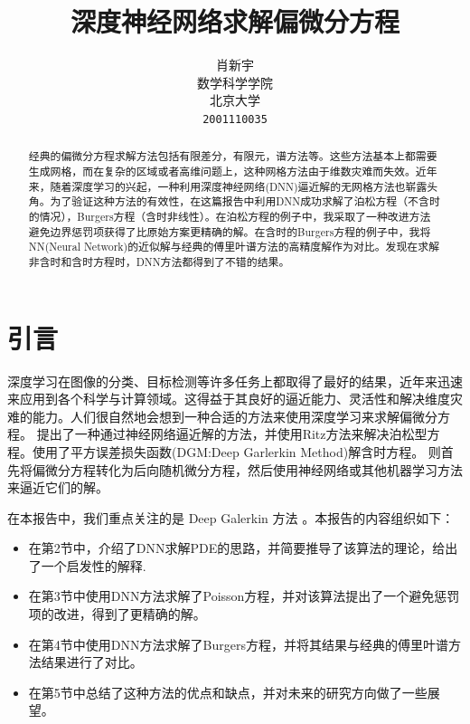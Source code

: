 \documentclass{article}
\title{深度神经网络求解偏微分方程}
\author{
  肖新宇\\数学科学学院\\北京大学\\ \texttt{2001110035} \\
}
\begin{document}
\maketitle

\begin{abstract}
\par 经典的偏微分方程求解方法包括有限差分，有限元，谱方法等。这些方法基本上都需要生成网格，而在复杂的区域或者高维问题上，这种网格方法由于维数灾难而失效。近年来，随着深度学习的兴起，一种利用深度神经网络(DNN)逼近解的无网格方法\cite{PINN}也崭露头角。为了验证这种方法的有效性，在这篇报告中利用DNN成功求解了泊松方程（不含时的情况），Burgers方程（含时非线性）。在泊松方程的例子中，我采取了一种改进方法避免边界惩罚项获得了比原始方案更精确的解。在含时的Burgers方程的例子中，我将NN(Neural Network)的近似解与经典的傅里叶谱方法的高精度解作为对比。发现在求解非含时和含时方程时，DNN方法都得到了不错的结果。
\end{abstract}

\section{引言}
深度学习\cite{lecun2015deep}在图像的分类、目标检测等许多任务上都取得了最好的结果，近年来迅速来应用到各个科学与计算领域。这得益于其良好的逼近能力、灵活性和解决维度灾难的能力。人们很自然地会想到一种合适的方法来使用深度学习来求解偏微分方程。 \cite{yu2017deep} 提出了一种通过神经网络逼近解的方法，并使用Ritz方法来解决泊松型方程。\cite{DGM}\cite{PINN}使用了平方误差损失函数(DGM:Deep Garlerkin Method)解含时方程。 \cite{1707.02568}\cite{weinan2017deep}\cite{beck2017machine} 则首先将偏微分方程转化为后向随机微分方程，然后使用神经网络或其他机器学习方法来逼近它们的解。


\par 在本报告中，我们重点关注的是 Deep Galerkin 方法 \cite{PINN}。本报告的内容组织如下：
\begin{itemize}
\item 在第2节中，介绍了DNN求解PDE的思路，并简要推导了该算法的理论，给出了一个启发性的解释.
\item 在第3节中使用DNN方法求解了Poisson方程，并对该算法提出了一个避免惩罚项的改进，得到了更精确的解。
\item 在第4节中使用DNN方法求解了Burgers方程，并将其结果与经典的傅里叶谱方法结果进行了对比。
\item 在第5节中总结了这种方法的优点和缺点，并对未来的研究方向做了一些展望。
\end{itemize}
\end{document}
